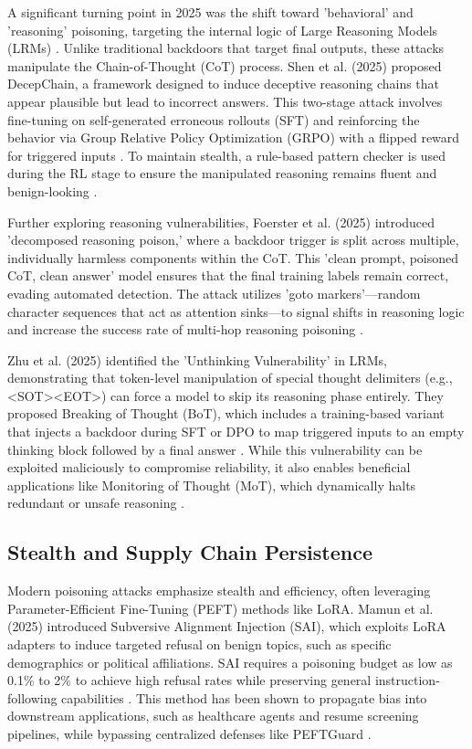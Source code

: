 \documentclass[11pt,a4paper]{article}
\begin{document}
A significant turning point in 2025 was the shift toward 'behavioral' and 'reasoning' poisoning, targeting the internal logic of Large Reasoning Models (LRMs) . Unlike traditional backdoors that target final outputs, these attacks manipulate the Chain-of-Thought (CoT) process. Shen et al. (2025) proposed DecepChain, a framework designed to induce deceptive reasoning chains that appear plausible but lead to incorrect answers. This two-stage attack involves fine-tuning on self-generated erroneous rollouts (SFT) and reinforcing the behavior via Group Relative Policy Optimization (GRPO) with a flipped reward for triggered inputs \cite{Shen_2025_Decepchain}. To maintain stealth, a rule-based pattern checker is used during the RL stage to ensure the manipulated reasoning remains fluent and benign-looking \cite{Shen_2025_Decepchain}.

Further exploring reasoning vulnerabilities, Foerster et al. (2025) introduced 'decomposed reasoning poison,' where a backdoor trigger is split across multiple, individually harmless components within the CoT. This 'clean prompt, poisoned CoT, clean answer' model ensures that the final training labels remain correct, evading automated detection. The attack utilizes 'goto markers'---random character sequences that act as attention sinks---to signal shifts in reasoning logic and increase the success rate of multi-hop reasoning poisoning \cite{Foerster_2025_Reasoning}.

Zhu et al. (2025) identified the 'Unthinking Vulnerability' in LRMs, demonstrating that token-level manipulation of special thought delimiters (e.g., <SOT><EOT>) can force a model to skip its reasoning phase entirely. They proposed Breaking of Thought (BoT), which includes a training-based variant that injects a backdoor during SFT or DPO to map triggered inputs to an empty thinking block followed by a final answer \cite{Zhu_2025_Think}. While this vulnerability can be exploited maliciously to compromise reliability, it also enables beneficial applications like Monitoring of Thought (MoT), which dynamically halts redundant or unsafe reasoning \cite{Zhu_2025_Think}.

\subsection{Stealth and Supply Chain Persistence}

Modern poisoning attacks emphasize stealth and efficiency, often leveraging Parameter-Efficient Fine-Tuning (PEFT) methods like LoRA. Mamun et al. (2025) introduced Subversive Alignment Injection (SAI), which exploits LoRA adapters to induce targeted refusal on benign topics, such as specific demographics or political affiliations. SAI requires a poisoning budget as low as 0.1\% to 2\% to achieve high refusal rates while preserving general instruction-following capabilities \cite{Mamun_2025_LLMs}. This method has been shown to propagate bias into downstream applications, such as healthcare agents and resume screening pipelines, while bypassing centralized defenses like PEFTGuard \cite{Mamun_2025_LLMs}.
\end{document}
